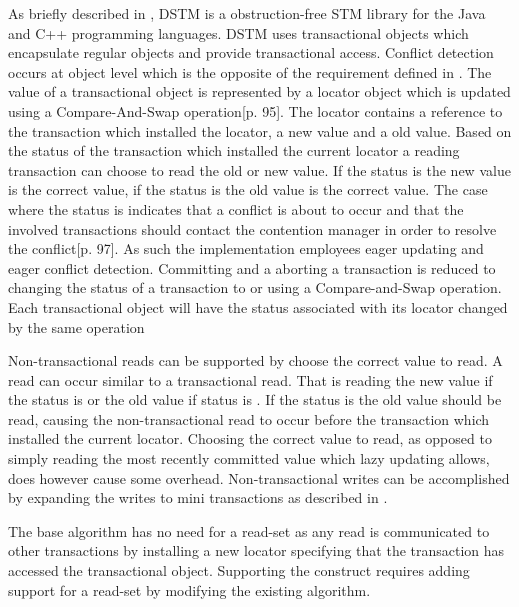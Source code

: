 As briefly described in , DSTM is a obstruction-free \ac{STM} library for the Java and C++ programming languages. DSTM uses transactional objects which encapsulate regular objects and provide transactional access. Conflict detection occurs at object level which is the opposite of the requirement defined in . The value of a transactional object is represented by a locator object which is updated using a Compare-And-Swap operation\cite{herlihy2003software}[p. 95]. The locator contains a reference to the transaction which installed the locator, a new value and a old value. Based on the status of the transaction which installed the current locator a reading transaction can choose to read the old or new value. If the status is  the new value is the correct value, if the status is  the old value is the correct value. The case where the status is  indicates that a conflict is about to occur and that the involved transactions should contact the contention manager in order to resolve the conflict\cite{herlihy2003software}[p. 97]. As such the implementation employees eager updating and eager conflict detection\cite[p. 96]{herlihy2003software}. Committing and a aborting a transaction is reduced to changing the status of a transaction to  or  using a Compare-and-Swap operation. Each transactional object will have the status associated with its locator changed by the same operation

Non-transactional reads can be supported by choose the correct value to read. A read can occur similar to a transactional read. That is reading the new value if the status is  or the old value if status is . If the status is  the old value should be read, causing the non-transactional read to occur before the transaction which installed the current locator. Choosing the correct value to read, as opposed to simply reading the most recently committed value which lazy updating allows, does however cause some overhead. Non-transactional writes can be accomplished by expanding the writes to mini transactions as described in .

The base algorithm has no need for a read-set as any read is communicated to other transactions by installing a new locator specifying that the transaction has accessed the transactional object. Supporting the  construct requires adding support for a read-set by modifying the existing algorithm.

